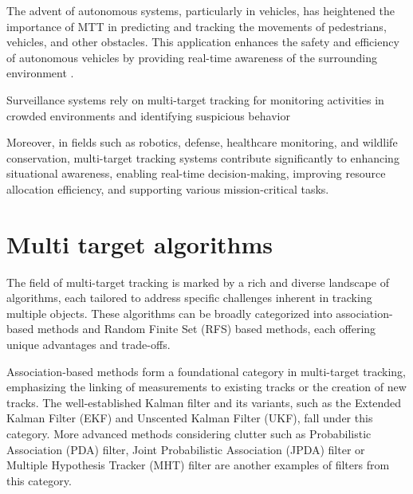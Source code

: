 The advent of autonomous systems, particularly in vehicles, has heightened the importance of MTT in predicting and tracking the movements of pedestrians, vehicles, and other obstacles. This application enhances the safety and efficiency of autonomous vehicles by providing real-time awareness of the surrounding environment \cite{milan2016}.

Surveillance systems rely on multi-target tracking for monitoring activities in crowded environments and identifying suspicious behavior

Moreover, in fields such as robotics, defense, healthcare monitoring, and wildlife conservation, multi-target tracking systems contribute significantly to enhancing situational awareness, enabling real-time decision-making, improving resource allocation efficiency, and supporting various mission-critical tasks.



\section{Multi target algorithms}
The field of multi-target tracking is marked by a rich and diverse landscape of algorithms, each tailored to address specific challenges inherent in tracking multiple objects. These algorithms can be broadly categorized into association-based methods and Random Finite Set (RFS) based methods, each offering unique advantages and trade-offs.

Association-based methods form a foundational category in multi-target tracking, emphasizing the linking of measurements to existing tracks or the creation of new tracks. The well-established Kalman filter and its variants, such as the Extended Kalman Filter (EKF) and Unscented Kalman Filter (UKF), fall under this category. More advanced methods considering clutter such as Probabilistic Association (PDA) filter, Joint Probabilistic Association (JPDA) filter or Multiple Hypothesis Tracker (MHT) filter are another examples of filters from this category.

